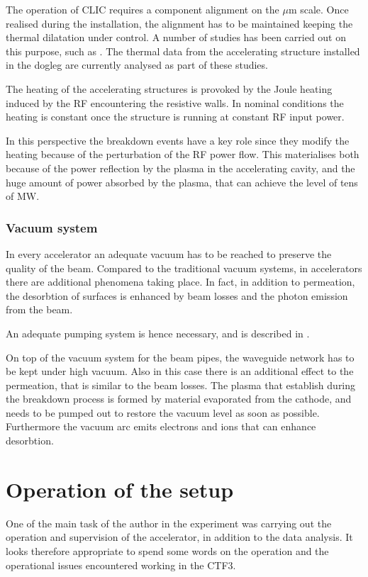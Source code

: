 The operation of CLIC requires a component alignment on the $\mu$m scale. Once realised during the installation, the alignment has to be maintained keeping the thermal dilatation under control. A number of studies has been carried out on this purpose, such as \cite{Daskalaki:2141828}. The thermal data from the accelerating structure installed in the dogleg are currently analysed as part of these studies.

The heating of the accelerating structures is provoked by the Joule heating induced by the RF encountering the resistive walls. In nominal conditions the heating is constant once the structure is running at constant RF input power. 

In this perspective the breakdown events have a key role since they modify the heating because of the perturbation of the RF power flow. This materialises both because of the power reflection by the plasma in the accelerating cavity, and the huge amount of power absorbed by the plasma, that can achieve the level of tens of MW.


\subsubsection{Vacuum system}

In every accelerator an adequate vacuum has to be reached to preserve the quality of the beam. Compared to the traditional vacuum systems, in accelerators there are additional phenomena taking place. In fact, in addition to permeation, the desorbtion of surfaces is enhanced by beam losses and the photon emission from the beam. 

An adequate pumping system is hence necessary, and is described in \cite{ctf3:dr}.

On top of the vacuum system for the beam pipes, the waveguide network has to be kept under high vacuum. Also in this case there is an additional effect to the permeation, that is similar to the beam losses. The plasma that establish during the breakdown process is formed by material evaporated from the cathode, and needs to be pumped out to restore the vacuum level as soon as possible. Furthermore the vacuum arc emits electrons and ions that can enhance desorbtion.


\section[Operation of the setup]{Operation of the setup}

One of the main task of the author in the experiment was carrying out the operation and supervision of the accelerator, in addition to the data analysis. It looks therefore appropriate to spend some words on the operation and the operational issues encountered working in the CTF3.

